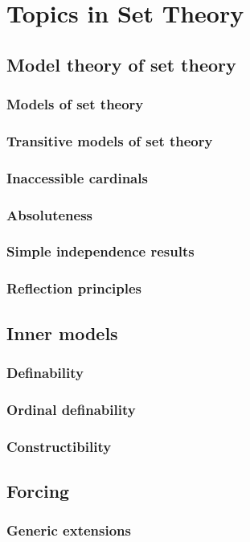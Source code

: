 \documentclass[main.tex]{subfiles}
\begin{document}
	\chapter{Topics in Set Theory}
	\section{Model theory of set theory}
	\subsection{Models of set theory}
	
	\subsection{Transitive models of set theory}
	
	\subsection{Inaccessible cardinals}
	
	\subsection{Absoluteness}
	
	\subsection{Simple independence results}
	
	\subsection{Reflection principles}
	
	\section{Inner models}
	\subsection{Definability}
	
	\subsection{Ordinal definability}
	
	\subsection{Constructibility}
	
	\section{Forcing}
	\subsection{Generic extensions}
\end{document}
